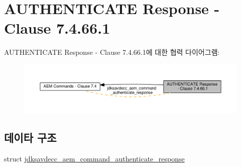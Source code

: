 \hypertarget{group__command__authenticate__response}{}\section{A\+U\+T\+H\+E\+N\+T\+I\+C\+A\+TE Response -\/ Clause 7.4.66.1}
\label{group__command__authenticate__response}
A\+U\+T\+H\+E\+N\+T\+I\+C\+A\+TE Response -\/ Clause 7.4.66.1에 대한 협력 다이어그램\+:
\nopagebreak
\begin{figure}[H]
\begin{center}
\leavevmode
\includegraphics[width=350pt]{group__command__authenticate__response}
\end{center}
\end{figure}
\subsection*{데이타 구조}
\begin{DoxyCompactItemize}
\item 
struct \hyperlink{structjdksavdecc__aem__command__authenticate__response}{jdksavdecc\+\_\+aem\+\_\+command\+\_\+authenticate\+\_\+response}
\end{DoxyCompactItemize}

